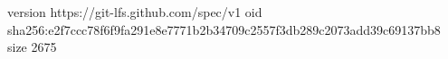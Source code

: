 version https://git-lfs.github.com/spec/v1
oid sha256:e2f7ccc78f6f9fa291e8e7771b2b34709c2557f3db289c2073add39c69137bb8
size 2675
